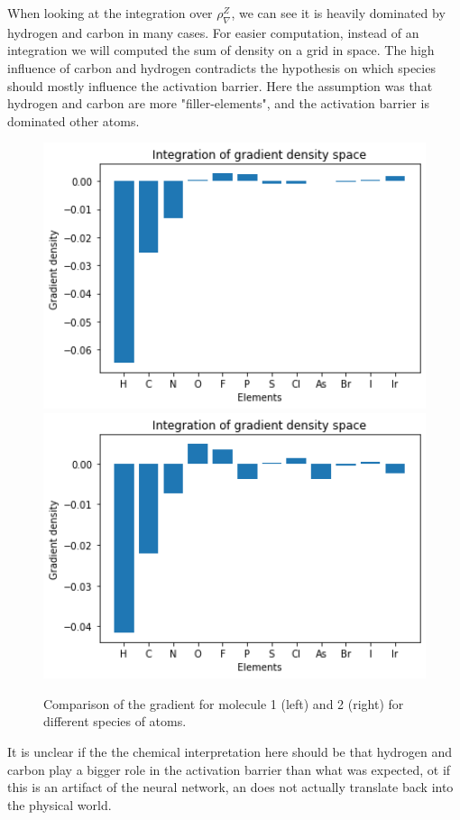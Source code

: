 When looking at the integration over $\rho^Z_\nabla$, we can see it is heavily dominated by hydrogen and carbon
in many cases.
For easier computation, instead of an integration we will computed the sum of density on a grid in space.
The high influence of carbon and hydrogen contradicts the hypothesis on which species should mostly influence the activation barrier.
Here the assumption was that hydrogen and carbon are more "filler-elements", and the activation 
barrier is dominated other atoms.

\begin{figure}[!htb]
    \includegraphics[width=1.0\textwidth]{figures/evaluation/elem2-GRAD.png}
  \endminipage\hfill
    \includegraphics[width=1.0\textwidth]{figures/evaluation/elem1-GRAD.png}
  \endminipage\hfill
  \caption{
    Comparison of the gradient for molecule 1 (left) and 2 (right) for different species of atoms.
  }
  \label{fig:snap_global_gradient}

\end{figure}


It is unclear if the the chemical interpretation here should be that hydrogen and carbon play a bigger role in the activation
barrier than what was expected, ot if this is an artifact of the neural network, an does not actually translate back into 
the physical world.

